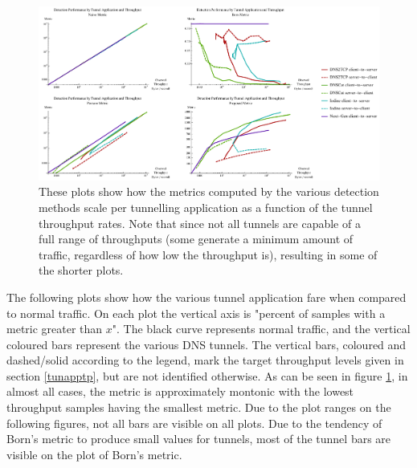 \documentclass[12pt]{report}
\theoremstyle{remark}
\theoremstyle{definition}
\theoremstyle{definition}
\theoremstyle{definition}
\begin{document}
\begin{landscape}
\begin{figure}
\centering
\includegraphics[width=1.4\textwidth]{figures/mpbtt.pdf}
\caption[Scaling of Detection Metrics by Tunnel Throughput]{These plots show how
the metrics computed by the various detection methods scale per tunnelling
application as a function of the tunnel throughput rates. Note that since not
all tunnels are capable of a full range of throughputs (some generate a minimum
amount of traffic, regardless of how low the throughput is), resulting in some
of the shorter plots.}
\label{mbtt}
\end{figure}
\end{landscape}

The following plots show how the various tunnel application fare when compared to normal traffic. On each plot the vertical axis is "percent of samples with a metric greater than $x$". The black curve represents normal traffic, and the vertical coloured bars represent the various DNS tunnels. The vertical bars, coloured and dashed/solid according to the legend, mark the target throughput levels given in section \ref{tunapptp}, but are not identified otherwise. As can be seen in figure \ref{mbtt}, in almost all cases, the metric is approximately montonic with the lowest throughput samples having the smallest metric. Due to the plot ranges on the following figures, not all bars are visible on all plots. Due to the tendency of Born's metric to produce small values for tunnels, most of the tunnel bars are visible on the plot of Born's metric.
\end{document}
